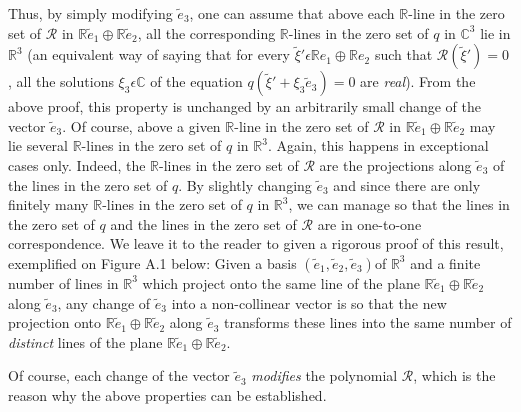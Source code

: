 Thus, by simply modifying $\widetilde{e}_{3}$, one can assume that above each $\mathbb{R}$-line in the zero set of $\mathscr{R}$ in $\mathbb{R}\widetilde{e}_{1} \oplus \mathbb{R} \widetilde{e}_{2}$, all the corresponding $\mathbb{R}$-lines in the zero set of $q$ in $\mathbb{C}^{3}$ lie in $\mathbb{R}^{3}$ (an equivalent way of saying that for every $\widetilde{\xi}' \epsilon \mathbb{R} e_{1} \oplus \mathbb{R} e_{2}$ such that $\mathscr{R}(\widetilde{\xi}') = 0$, all the solutions $\xi_{3} \epsilon \mathbb{C}$ of the equation $q(\widetilde{\xi}' + \xi_{3} \widetilde{e}_{3}) = 0$ are {\em real}). From the above proof, this property is unchanged by an arbitrarily small change of the vector $\widetilde{e}_{3}$. Of course, above a given $\mathbb{R}$-line in the zero set of $\mathscr{R}$ in $\mathbb{R} \widetilde{e}_{1} \oplus \mathbb{R} \widetilde{e}_{2}$ may lie several $\mathbb{R}$-lines in the zero set of $q$ in $\mathbb{R}^{3}$. Again, this happens in exceptional cases only. Indeed, the $\mathbb{R}$-lines in the zero set of $\mathscr{R}$ are the projections along $\widetilde{e}_{3}$ of the lines in the zero set of $q$. By slightly changing $\widetilde{e}_{3}$ and since there are only finitely many $\mathbb{R}$-lines in the zero set of $q$ in $\mathbb{R}^{3}$, we can manage so that the lines in the zero set of $q$ and the lines in the zero set of $\mathscr{R}$ are in one-to-one correspondence. We leave it to the reader to given a rigorous proof of this result, exemplified on Figure A.1 below: Given a basis $(\widetilde{e}_{1}, \widetilde{e}_{2}, \widetilde{e}_{3})$\pageoriginale of $\mathbb{R}^{3}$ and a finite number of lines in $\mathbb{R}^{3}$ which project onto the same line of the plane $\mathbb{R}\widetilde{e}_{1} \oplus \mathbb{R} \widetilde{e}_{2}$ along $\widetilde{e}_{3}$, any change of $\widetilde{e}_{3}$ into a non-collinear vector is so that the new projection onto $\mathbb{R} \widetilde{e}_{1} \oplus \mathbb{R} \widetilde{e}_{2}$ along $\widetilde{e}_{3}$ transforms these lines into the same number of {\em distinct} lines of the plane $\mathbb{R} \widetilde{e}_{1} \oplus \mathbb{R} \widetilde{e}_{2}$.

\begin{alphremark}\label{app-1-remA.1}
Of course, each change of the vector $\widetilde{e}_{3}$ {\em modifies} the polynomial $\mathscr{R}$, which is the reason why the above properties can be established.
\end{alphremark}


